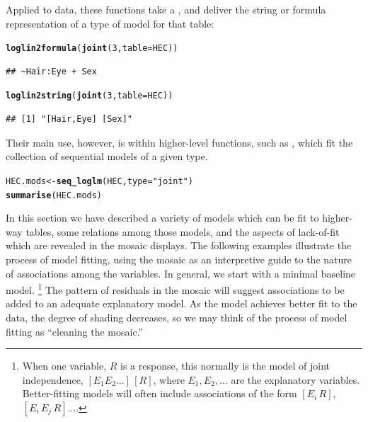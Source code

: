 \documentclass[11pt]{book}\usepackage[]{graphicx}\usepackage[]{color}
\makeatletter
\newcommand{\hlnum}[1]{\textcolor[rgb]{0.686,0.059,0.569}{#1}}%
\newcommand{\hlstr}[1]{\textcolor[rgb]{0.192,0.494,0.8}{#1}}%
\newcommand{\hlstd}[1]{\textcolor[rgb]{0.345,0.345,0.345}{#1}}%
\newcommand{\hlkwb}[1]{\textcolor[rgb]{0.69,0.353,0.396}{#1}}%
\newcommand{\hlkwc}[1]{\textcolor[rgb]{0.333,0.667,0.333}{#1}}%
\newcommand{\hlkwd}[1]{\textcolor[rgb]{0.737,0.353,0.396}{\textbf{#1}}}%
\newenvironment{kframe}{%
 \def\at@end@of@kframe{}%
 \ifinner\ifhmode%
  \def\at@end@of@kframe{\end{minipage}}%
  \begin{minipage}{\columnwidth}%
 \fi\fi%
 \def\FrameCommand##1{\hskip\@totalleftmargin \hskip-\fboxsep
 \colorbox{shadecolor}{##1}\hskip-\fboxsep
     \hskip-\linewidth \hskip-\@totalleftmargin \hskip\columnwidth}%
 \MakeFramed {\advance\hsize-\width
   \@totalleftmargin\z@ \linewidth\hsize
   \@setminipage}}%
 {\par\unskip\endMakeFramed%
 \at@end@of@kframe}
\newenvironment{knitrout}{}{} %
\renewenvironment{knitrout}{\small\renewcommand{\baselinestretch}{.85}}{} %
\makeatother
\begin{document}
Applied to data, these functions take a , and deliver
the string or formula representation of a type of model for that table:
\begin{knitrout}
\color{fgcolor}\begin{kframe}
\begin{alltt}
\hlkwd{loglin2formula}\hlstd{(}\hlkwd{joint}\hlstd{(}\hlnum{3}\hlstd{,} \hlkwc{table}\hlstd{=HEC))}
\end{alltt}
\begin{verbatim}
## ~Hair:Eye + Sex
\end{verbatim}
\begin{alltt}
\hlkwd{loglin2string}\hlstd{(}\hlkwd{joint}\hlstd{(}\hlnum{3}\hlstd{,} \hlkwc{table}\hlstd{=HEC))}
\end{alltt}
\begin{verbatim}
## [1] "[Hair,Eye] [Sex]"
\end{verbatim}
\end{kframe}
\end{knitrout}

Their main use, however, is within higher-level functions,
such as , which fit the collection of sequential models
of a given type.
\begin{knitrout}
\color{fgcolor}\begin{kframe}
\begin{alltt}
\hlstd{HEC.mods} \hlkwb{<-} \hlkwd{seq_loglm}\hlstd{(HEC,} \hlkwc{type}\hlstd{=}\hlstr{"joint"}\hlstd{)}
\hlkwd{summarise}\hlstd{(HEC.mods)}
\end{alltt}


{\ttfamily\noindent\bfseries\color{errorcolor}{\#\# Error: length(rows) == 1 is not TRUE}}\end{kframe}
\end{knitrout}


In this section we have described a variety of models which can be fit
to higher-way tables, some relations among those models, and the aspects
of lack-of-fit which are revealed in the mosaic displays.
The following examples illustrate the process of model fitting,
using the mosaic as an interpretive guide to the nature of associations
among the variables.
In general, we start with a minimal baseline model.%
%
\footnote{When one variable, $R$
is a response, this normally is the model of joint independence,
\([E_1 E_2 \dots] \, [R]\), where \(E_1, E_2, \dots\) are the explanatory
variables.  Better-fitting models will often include associations
of the form \([E_i \, R]\), \([E_i \, E_j \, R] \dots \).
}
The pattern of residuals in the mosaic will suggest associations to be added
to an adequate explanatory model.
As the model achieves better fit to the data, the degree of shading
decreases, so we may think of the process of model fitting as
``cleaning the mosaic.''
\end{document}
